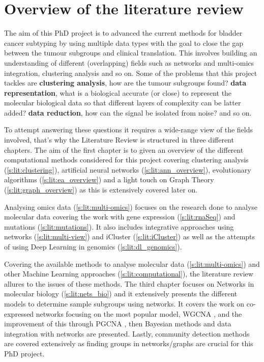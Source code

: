 

\section{Overview of the literature review}


The aim of this PhD project is to advanced the current methods for bladder cancer subtyping by using multiple data types with the goal to close the gap between the tumour subgroups and clinical translation. This involves building an understanding of different (overlapping) fields such as networks and multi-omics integration, clustering analysis and so on. Some of the problems that this project tackles are \textbf{clustering analysis}, how are the tumour subgroups found? \textbf{data representation}, what is a biological accurate (or close) to represent the molecular biological data so that different layers of complexity can be latter added? \textbf{data reduction}, how can the signal be isolated from noise? and so on.

To attempt answering these questions it requires a wide-range view of the fields involved, that's why the Literature Review is structured in three different chapters. The aim of the first chapter is to given an overview of the different computational methods considered for this project covering clustering analysis (\ref{s:lit:clustering}), artificial neural networks (\ref{s:lit:ann_overview}), evolutionary algorithms (\ref{s:lit:ea_overview}) and a light touch on Graph Theory (\ref{s:lit:graph_overview}) as this is extensively covered later on.

Analysing omics data (\ref{s:lit:multi-omics}) focuses on the research done to analyse molecular data covering the work with gene expression (\ref{s:lit:rnaSeq}) and mutations (\ref{s:lit:mutations}). It also includes integrative approaches using networks (\ref{s:lit:multi-view}) and iCluster (\ref{s:lit:iCluster}) as well as the attempts of using Deep Learning in genomics (\ref{s:lit:dl_genomics}). 

Covering the available methods to analyse molecular data (\ref{s:lit:multi-omics}) and other Machine Learning approaches (\ref{s:lit:computational}), the literature review allures to the issues of these methods. The third chapter focuses on Networks in molecular biology (\ref{s:lit:nets_bio}) and it extensively presents the different models to determine sample subgroups using networks. It covers the work on co-expressed networks focusing on the most popular model, WGCNA \cite{Langfelder2008-sn}, and the improvement of this through PGCNA \cite{Care2019-ij}, then Bayesian methods and data integration with networks are presented. Lastly, community detection methods are covered extensively as finding groups in networks/graphs are crucial for this PhD project.

